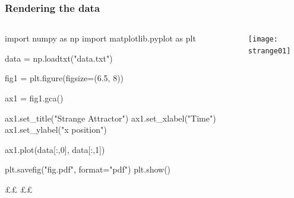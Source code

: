 \documentclass[handout, notes=hide]{beamer}
\begin{document}
\begin{frame}[fragile]
\frametitle{Rendering the data}
\setlength{\parskip}{0.5em}

\begin{columns}[T]
\begin{column}[T]{0.5\textwidth}
\setlength{\parskip}{0.7em}

\begin{python}
import numpy as np
import matplotlib.pyplot as plt


data = np.loadtxt("data.txt")

fig1 = plt.figure(figsize=(6.5, 8))

ax1 = fig1.gca()

ax1.set_title("Strange Attractor")
ax1.set_xlabel("Time")
ax1.set_ylabel("x position")


ax1.plot(data[:,0], data[:,1])



plt.savefig("fig.pdf", format="pdf")
plt.show()






££  ££
\end{python}

\end{column}
\begin{column}[T]{0.5\textwidth}

\texttt{[image: strange01]}
\end{column}
\end{columns}


\end{frame}
\note{
\setlength{\parskip}{0.5em}
}
 
\end{document}
